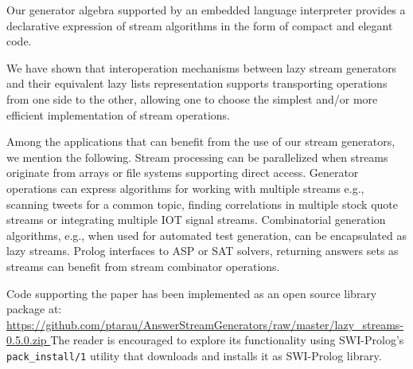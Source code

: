 \documentclass{new_tlp}
\begin{document}
Our generator algebra supported by an embedded language interpreter provides
a declarative expression of stream algorithms in the form of compact and elegant code.

We have shown that interoperation mechanisms 
between lazy stream generators and their 
equivalent lazy lists representation
supports transporting operations from one side to the other,
allowing one to choose the simplest and/or more efficient
implementation of stream operations.

Among the applications that can benefit from the use of our stream generators, we mention the following.
Stream processing  can be parallelized when streams originate from  arrays or
file systems supporting  direct access.
Generator operations can express algorithms for working with multiple streams 
e.g., scanning tweets for a common topic,  finding correlations in multiple stock quote streams or integrating multiple IOT signal streams.
Combinatorial generation algorithms, e.g., when used for automated test generation, can be encapsulated as lazy streams.
Prolog interfaces to  ASP or SAT solvers, returning answers sets as streams can benefit from stream combinator operations.

Code supporting the paper has been implemented as an open source library package at:\\
{\small \url{https://github.com/ptarau/AnswerStreamGenerators/raw/master/lazy_streams-0.5.0.zip } }
The reader is encouraged to explore its functionality using SWI-Prolog's {\tt pack\_install/1} utility that downloads and installs it as SWI-Prolog library.



\end{document}
